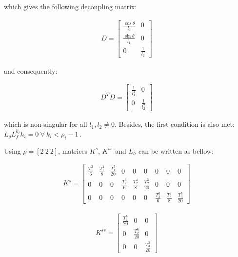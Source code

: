 \documentclass[letterpaper, 10 pt, conference]{ieeeconf}  %
\begin{document}
which gives the following decoupling matrix:

\begin{eqnarray}
D = 
\left[\begin{array}{cc}
\frac{\cos\theta}{l_1} & 0\\
\frac{\sin\theta}{l_1} & 0\\
0 & \frac{1}{l_2}
\end{array}\right]
\end{eqnarray}

and consequently:

\begin{eqnarray}
D^TD = 
\left[\begin{array}{cc}
\frac{1}{l_1^2} & 0\\
0 & \frac{1}{l_2^2}
\end{array}\right]
\end{eqnarray}

which is non-singular for all $l_1, l_2 \neq 0$. Besides, the first condition is also met: $L_gL^{k_i}_fh_i = 0\ \forall\ k_i < \rho_i-1\ $.

Using $\rho = [2\ 2\ 2]$, matrices $K^{s}$, $K^{ss}$ and $L_h$ can be written as bellow:

\begin{eqnarray}
K^s =
\left[\begin{array}{ccccccccc}
\frac{T_1^3}{6} & \frac{T_1^4}{8} & \frac{T_1^5}{20} & 0 & 0 & 0 & 0 & 0 & 0\\
0 & 0 & 0 & \frac{T_2^3}{6} & \frac{T_2^4}{8} & \frac{T_2^5}{20} & 0 & 0 & 0\\
0 & 0 & 0 & 0 & 0 & 0 & \frac{T_3^3}{6} & \frac{T_3^4}{8} & \frac{T_3^5}{20}
\end{array}\right]
\end{eqnarray}

\begin{eqnarray}
K^{ss} =
\left[\begin{array}{ccc}
\frac{T_1^5}{20} & 0 & 0\\
0 & \frac{T_2^5}{20} & 0\\
0 & 0 & \frac{T_3^5}{20}
\end{array}\right]
\end{eqnarray}

\end{document}
